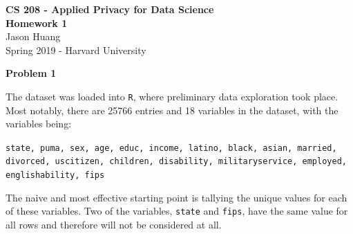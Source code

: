 \documentclass[12pt]{article}
\begin{document}
\begin{center}
	{\Large \textbf{CS 208 - Applied Privacy for Data Science}}\\
	{\Large \textbf{Homework 1}}\\
	\vspace*{0.1in}
	Jason Huang\\
	Spring 2019 - Harvard University\\
\end{center}

{\large\textbf{Problem 1}}


The dataset was loaded into \texttt{R}, where preliminary data exploration took place. Most notably, there are 25766 entries and 18 variables in the dataset, with the variables being:
\begin{center}
\texttt{state, puma, sex, age, educ, income, latino, black, asian, married, divorced, uscitizen, children, disability, militaryservice, employed, englishability, fips}
\end{center}
The naive and most effective starting point is tallying the unique values for each of these variables. Two of the variables, \texttt{state} and \texttt{fips}, have the same value for all rows and therefore will not be considered at all.


\end{document}
